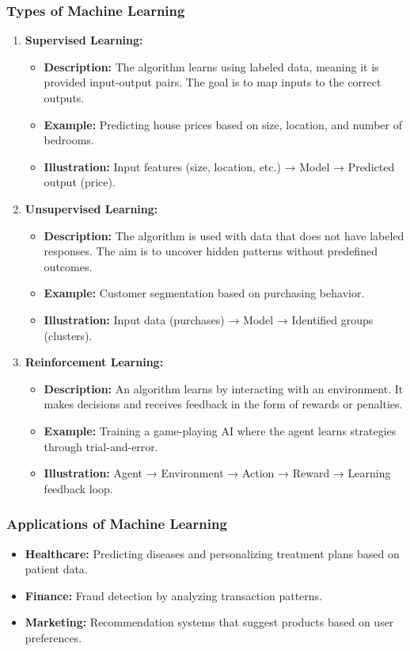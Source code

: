 \documentclass[aspectratio=169]{beamer}
\begin{document}
\begin{frame}[fragile]
    \frametitle{Types of Machine Learning}
    \begin{enumerate}
        \item \textbf{Supervised Learning:}
        \begin{itemize}
            \item \textbf{Description:} The algorithm learns using labeled data, meaning it is provided input-output pairs. The goal is to map inputs to the correct outputs.
            \item \textbf{Example:} Predicting house prices based on size, location, and number of bedrooms.
            \item \textbf{Illustration:} Input features (size, location, etc.) → Model → Predicted output (price).
        \end{itemize}

        \item \textbf{Unsupervised Learning:}
        \begin{itemize}
            \item \textbf{Description:} The algorithm is used with data that does not have labeled responses. The aim is to uncover hidden patterns without predefined outcomes.
            \item \textbf{Example:} Customer segmentation based on purchasing behavior.
            \item \textbf{Illustration:} Input data (purchases) → Model → Identified groups (clusters).
        \end{itemize}

        \item \textbf{Reinforcement Learning:}
        \begin{itemize}
            \item \textbf{Description:} An algorithm learns by interacting with an environment. It makes decisions and receives feedback in the form of rewards or penalties.
            \item \textbf{Example:} Training a game-playing AI where the agent learns strategies through trial-and-error.
            \item \textbf{Illustration:} Agent → Environment → Action → Reward → Learning feedback loop.
        \end{itemize}
    \end{enumerate}
\end{frame}

\begin{frame}[fragile]
    \frametitle{Applications of Machine Learning}
    \begin{itemize}
        \item \textbf{Healthcare:} Predicting diseases and personalizing treatment plans based on patient data.
        \item \textbf{Finance:} Fraud detection by analyzing transaction patterns.
        \item \textbf{Marketing:} Recommendation systems that suggest products based on user preferences.
    \end{itemize}
\end{frame}
\end{document}
